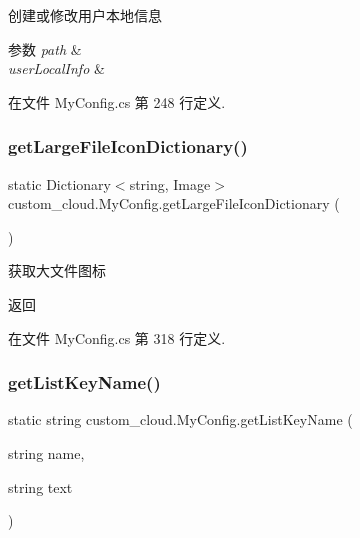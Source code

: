 创建或修改用户本地信息 


\begin{DoxyParams}{参数}
{\em path} & \\
\hline
{\em user\+Local\+Info} & \\
\hline
\end{DoxyParams}


在文件 My\+Config.\+cs 第 248 行定义.

\mbox{\label{classcustom__cloud_1_1_my_config_ad7d937041ae6ee8c716233eaf8a394fd}} 
\subsubsection{\texorpdfstring{get\+Large\+File\+Icon\+Dictionary()}{getLargeFileIconDictionary()}}
{\footnotesize\ttfamily static Dictionary$<$string, Image$>$ custom\+\_\+cloud.\+My\+Config.\+get\+Large\+File\+Icon\+Dictionary (\begin{DoxyParamCaption}{ }\end{DoxyParamCaption})\hspace{0.3cm}{\ttfamily [static]}}



获取大文件图标 

\begin{DoxyReturn}{返回}

\end{DoxyReturn}


在文件 My\+Config.\+cs 第 318 行定义.

\mbox{\label{classcustom__cloud_1_1_my_config_a8d96b3dd46dfb4087fd026debdaadd2e}} 
\subsubsection{\texorpdfstring{get\+List\+Key\+Name()}{getListKeyName()}}
{\footnotesize\ttfamily static string custom\+\_\+cloud.\+My\+Config.\+get\+List\+Key\+Name (\begin{DoxyParamCaption}\item[{string}]{name,  }\item[{string}]{text }\end{DoxyParamCaption})\hspace{0.3cm}{\ttfamily [static]}}



